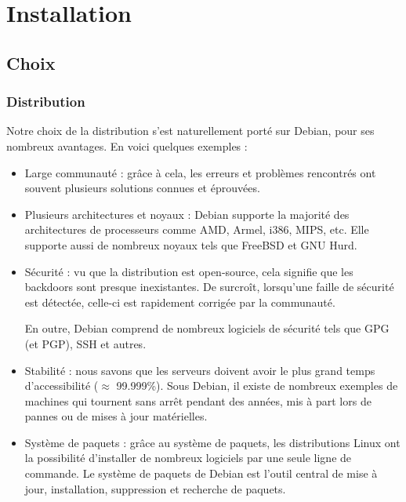 \chapter*{Installation} %
\label{cha:installation}

\section{Choix}
\label{sec:choix}

\subsection{Distribution}
\label{sec:distribution}

Notre choix de la distribution s'est naturellement porté sur Debian, pour ses
nombreux avantages. En voici quelques exemples :

\begin{itemize}
\item Large communauté : grâce à cela, les erreurs et problèmes rencontrés ont
  souvent plusieurs solutions connues et éprouvées.

\item Plusieurs architectures et noyaux : Debian supporte la majorité des
  architectures de processeurs comme AMD, Armel, i386, MIPS, etc. Elle supporte
  aussi de nombreux noyaux tels que FreeBSD et GNU Hurd.

\item Sécurité : vu que la distribution est open-source, cela signifie que les
  backdoors sont presque inexistantes. De surcroît, lorsqu'une faille de sécurité
  est détectée, celle-ci est rapidement corrigée par la communauté.

  En outre, Debian comprend de nombreux logiciels de sécurité tels que GPG (et
  PGP), SSH et autres.

\item Stabilité : nous savons que les serveurs doivent avoir le plus grand temps
d'accessibilité ($\approx$ 99.999\%). Sous Debian, il existe de nombreux exemples de
machines qui tournent sans arrêt pendant des années, mis à part lors de pannes
ou de mises à jour matérielles.

\item Système de paquets : grâce au système de paquets, les distributions Linux
ont la possibilité d'installer de nombreux logiciels par une seule ligne de
commande. Le système de paquets de Debian est l'outil central de mise à jour,
installation, suppression et recherche de paquets.
\end{itemize}

